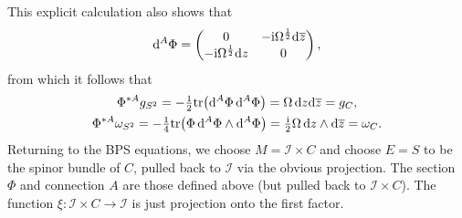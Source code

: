 \documentclass[pdftex]{sigma}
\newcommand{\II}{{\mathcal{I}}}
\newcommand{\1}{{\mathbb{1}}}
\def \d{\mathrm{d}}
\newcommand{\ol}{\overline}
\newcommand{\tr}{{\operatorname{tr}}}
\numberwithin{equation}{section}
\begin{document}
This explicit calculation also shows that
\begin{equation}
\label{spinorial dPhi}
\d^A\Phi = \begin{pmatrix}0&-{\rm i}\Omega^{\frac12}\d\ol{z} \\-{\rm i}\Omega^{\frac12}\d z&0\end{pmatrix},
\end{equation}
from which it follows that
\begin{gather*}
\Phi^{\ast A}g_{S^2} = -\tfrac12\tr\bigl(\d^A\Phi\,\d^A\Phi\bigr)=\Omega\,\d z\d\ol{z}=g_{C},\\
\Phi^{\ast A}\omega_{S^2} = -\tfrac14\tr\bigl(\Phi\,\d^A\Phi\wedge \d^A\Phi\bigr)=\tfrac{{\rm i}}{2}\Omega\,\d z\wedge\d\ol{z}=\omega_{C}.
\end{gather*}
Returning to the BPS equations, we choose $M=\II\times C$ and choose $E=S$ to be the spinor bundle of $C$, pulled back to $\II$ via the obvious projection. The section $\Phi$ and connection $A$ are those defined above (but pulled back to $\II\times C$). The function $\xi\colon \II\times C\to \II$ is just projection onto the first factor.
\end{document}
